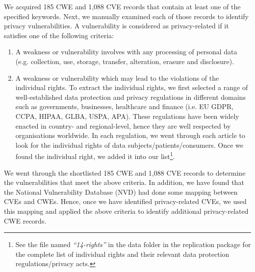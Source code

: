 We acquired 185 CWE and 1,088 CVE records that contain at least one of the specified keywords. Next, we manually examined each of those records to identify privacy vulnerabilities. A vulnerability is considered as privacy-related if it satisfies one of the following criteria:

\begin{enumerate}[leftmargin=*]
	\item A weakness or vulnerability involves with any processing of personal data (e.g. collection, use, storage, transfer, alteration, erasure and disclosure). %

    \item A weakness or vulnerability which may lead to the violations of the individual rights. To extract the individual rights, we first selected a range of well-established data protection and privacy regulations in different domains such as governments, businesses, healthcare and finance (i.e. EU GDPR, CCPA, HIPAA, GLBA, USPA, APA). These regulations have been widely enacted in country- and regional-level, hence they are well respected by organisations worldwide. In each regulation, we went through each article to look for the individual rights of data subjects/patients/consumers. Once we found the individual right, we added it into our list\footnote{See the file named \emph{``14-rights''} in the data folder in the replication package for the complete list of individual rights and their relevant data protection regulations/privacy acts.}.

\end{enumerate}

We went through the shortlisted 185 CWE and 1,088 CVE records to determine the vulnerabilities that meet the above criteria. In addition, we have found that the National Vulnerability Database (NVD) had done some mapping between CVEs and CWEs. Hence, once we have identified privacy-related CVEs, we used this mapping and applied the above criteria to identify additional privacy-related CWE records.

